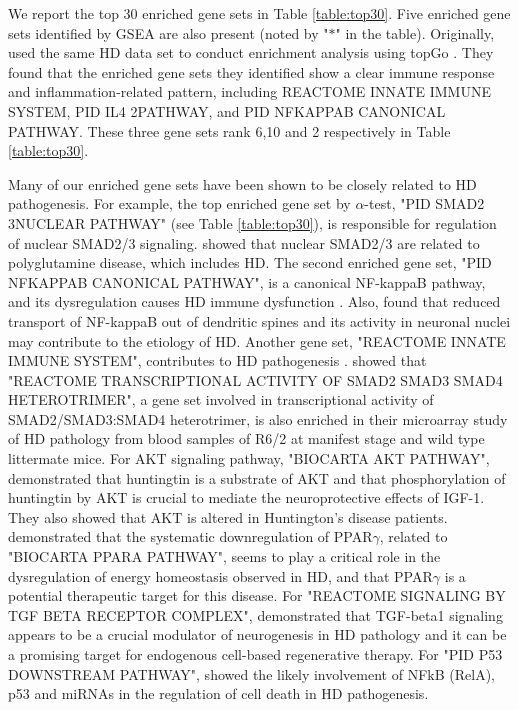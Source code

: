 \documentclass[useAMS,usenatbib, galley]{biom}
\newcommand{\OurMethod}{$\alpha$-test}
\begin{document}
	We report the top 30 enriched gene sets in Table \ref{table:top30}. Five enriched gene sets identified by GSEA are also present (noted by "$\ast$" in the table). Originally, \cite{labadorf2015rna} used the same HD data set to conduct enrichment analysis using topGo \citep{alexa2010topgo}. They found that the enriched gene sets they identified show a clear immune response and inflammation-related pattern, including REACTOME INNATE IMMUNE SYSTEM, PID IL4 2PATHWAY, and PID NFKAPPAB CANONICAL PATHWAY. These three gene sets rank 6,10 and 2 respectively in Table \ref{table:top30}.
	
	Many of our enriched gene sets have been shown to be closely related to HD pathogenesis. For example, the top enriched gene set by \OurMethod, "PID SMAD2 3NUCLEAR PATHWAY" (see Table \ref{table:top30}), is responsible for regulation of nuclear SMAD2/3 signaling. \cite{katsuno2010disrupted} showed that nuclear SMAD2/3 are related to polyglutamine disease, which includes HD. The second enriched gene set, "PID NFKAPPAB CANONICAL PATHWAY", is a canonical NF-kappaB pathway, and its dysregulation causes HD immune dysfunction \citep{trager2014htt}. Also, \cite{marcora2010huntington} found that reduced transport of NF-kappaB out of dendritic spines and its activity in neuronal nuclei may contribute to the etiology of HD. 
	Another gene set, "REACTOME INNATE IMMUNE SYSTEM", contributes to HD pathogenesis \citep{trager2014htt, labadorf2015rna}. \cite{diamanti2013whole} showed that "REACTOME TRANSCRIPTIONAL ACTIVITY OF SMAD2 SMAD3 SMAD4 HETEROTRIMER", a gene set involved in transcriptional activity of SMAD2/SMAD3:SMAD4 heterotrimer, is also enriched in their microarray study of HD pathology from blood samples of R6/2 at manifest stage and wild type littermate mice. For AKT signaling pathway, "BIOCARTA AKT PATHWAY", \cite{humbert2002igf} demonstrated that huntingtin is a substrate of AKT and that phosphorylation of huntingtin by AKT is crucial to mediate the neuroprotective effects of IGF-1. They also showed that AKT is altered in Huntington’s disease patients.  
	\cite{chiang2010modulation} demonstrated that the systematic downregulation of PPAR$\gamma$, related to "BIOCARTA PPARA PATHWAY", seems to play a critical role in the dysregulation of energy homeostasis observed in HD, and that PPAR$\gamma$ is a potential therapeutic target for this disease. For "REACTOME SIGNALING BY TGF BETA RECEPTOR COMPLEX",  \cite{kandasamy2011transforming} demonstrated that TGF-beta1 signaling appears to be a crucial modulator of neurogenesis in HD pathology and it can be a promising target for endogenous cell-based regenerative therapy. 
	For "PID P53 DOWNSTREAM PATHWAY", \cite{ghose2011regulation} showed the likely involvement of NFkB (RelA), p53 and miRNAs in the regulation of cell death in HD pathogenesis. 
	
\end{document}
